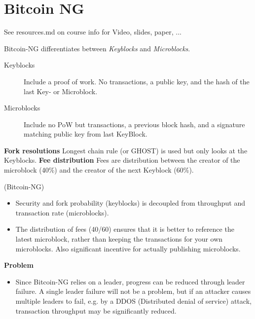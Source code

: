 \section{Bitcoin NG}
See resources.md on course info for Video, slides, paper, ...

\begin{definition} Bitcoin-NG differentiates between \emph{Keyblocks} and \emph{Microblocks}. 
	\begin{description}
		\item[Keyblocks] Include a proof of work. No transactions, a public key, and the hash of the last Key- or Microblock.
		\item[Microblocks] Include no PoW but transactions, a previous block hash, and a signature matching public key from last KeyBlock.
	\end{description}

	\noindent
	\textbf{Fork resolutions} Longest chain rule (or GHOST) is used but only looks at the Keyblocks.
	\textbf{Fee distribution} Fees are distribution between the creator of the microblock (40\%) and the creator of the next Keyblock (60\%).
\end{definition}

\begin{note} 
	(Bitcoin-NG)\newline
	
	
	\begin{itemize}
		\item Security and fork probability (keyblocks) is decoupled from throughput and transaction rate (microblocks).
		\item The distribution of fees (40/60) ensures that it is better to reference the latest microblock, rather than keeping the transactions for your own microblocks. Also significant incentive for actually publishing microblocks.
	\end{itemize}

\noindent	
\textbf{Problem}
	\begin{itemize}
		\item Since Bitcoin-NG relies on a leader, progress can be reduced through leader failure. A single leader failure will not be a problem, but if an attacker causes multiple leaders to fail, e.g. by a DDOS (Distributed denial of service) attack, transaction throughput may be significantly reduced.
	\end{itemize}
\end{note}

